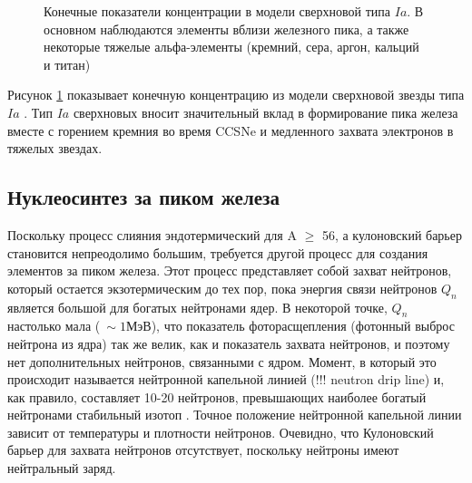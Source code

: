 \documentclass[%
master,    %
natbib,      %
subf,        %
href,        %
colorlinks,  %
]{disser}
\begin{document}
\begin{figure}[h]
	\caption{Конечные показатели концентрации в модели сверхновой типа $Ia$. В основном наблюдаются элементы вблизи железного пика, а также некоторые тяжелые альфа-элементы (кремний, сера, аргон, кальций и титан)}
	\label{ris:iron-abu}
\end{figure}

Рисунок \ref{ris:iron-abu} показывает конечную концентрацию из модели сверхновой звезды типа $Ia$ \cite{iron-abu}. Тип $Ia$ сверхновых вносит значительный вклад в формирование пика железа вместе с горением кремния во время CCSNe и медленного захвата электронов в тяжелых звездах.

\subsection{Нуклеосинтез за пиком железа}
Поскольку процесс слияния эндотермический для A $\ge$ 56, а кулоновский барьер становится непреодолимо большим, требуется другой процесс для создания элементов за пиком железа. Этот процесс представляет собой захват нейтронов, который остается экзотермическим до тех пор, пока энергия связи нейтронов $Q_n$ является большой для богатых нейтронами ядер. В некоторой точке, $Q_n$ настолько мала ($~\sim1 \text{МэВ}$), что показатель фоторасщепления (фотонный выброс нейтрона из ядра) так же велик, как и показатель захвата нейтронов, и поэтому нет дополнительных нейтронов, связанными с ядром. Момент, в который это происходит называется нейтронной капельной линией (!!! neutron drip line) и, как правило, составляет 10-20 нейтронов, превышающих наиболее богатый нейтронами стабильный изотоп \cite{cauldrons}. Точное положение нейтронной капельной линии зависит от температуры и плотности нейтронов. Очевидно, что Кулоновский барьер  для захвата нейтронов отсутствует, поскольку нейтроны имеют нейтральный заряд.
\end{document}
